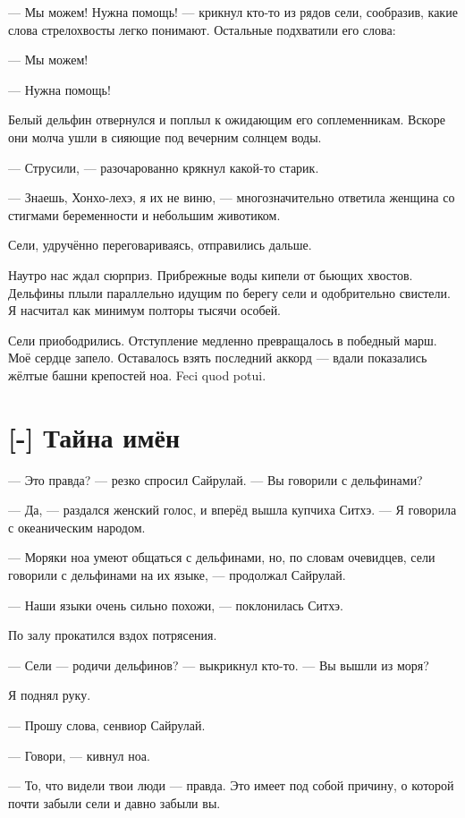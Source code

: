 --- Мы можем! Нужна помощь! --- крикнул кто-то из рядов сели, сообразив, какие слова стрелохвосты легко понимают.
Остальные подхватили его слова:

--- Мы можем!

--- Нужна помощь!

Белый дельфин отвернулся и поплыл к ожидающим его соплеменникам.
Вскоре они молча ушли в сияющие под вечерним солнцем воды.

--- Струсили, --- разочарованно крякнул какой-то старик.

--- Знаешь, Хонхо-лехэ, я их не виню, --- многозначительно ответила женщина со стигмами беременности и небольшим животиком.

Сели, удручённо переговариваясь, отправились дальше.

Наутро нас ждал сюрприз.
Прибрежные воды кипели от бьющих хвостов.
Дельфины плыли параллельно идущим по берегу сели и одобрительно свистели.
Я насчитал как минимум полторы тысячи особей.

Сели приободрились.
Отступление медленно превращалось в победный марш.
Моё сердце запело.
Оставалось взять последний аккорд --- вдали показались жёлтые башни крепостей ноа.
Feci quod potui.

\section{[-] Тайна имён}

\textspace

--- Это правда? --- резко спросил Сайрулай.
--- Вы говорили с дельфинами?

--- Да, --- раздался женский голос, и вперёд вышла купчиха Ситхэ.
--- Я говорила с океаническим народом.

--- Моряки ноа умеют общаться с дельфинами, но, по словам очевидцев, сели говорили с дельфинами на их языке, --- продолжал Сайрулай.

--- Наши языки очень сильно похожи, --- поклонилась Ситхэ.

По залу прокатился вздох потрясения.

--- Сели --- родичи дельфинов? --- выкрикнул кто-то.
--- Вы вышли из моря?

Я поднял руку.

--- Прошу слова, сенвиор Сайрулай.

--- Говори, --- кивнул ноа.

--- То, что видели твои люди --- правда.
Это имеет под собой причину, о которой почти забыли сели и давно забыли вы.

